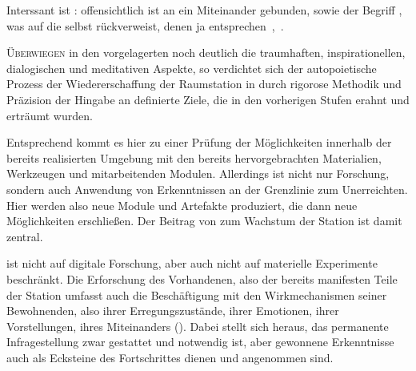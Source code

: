 Interssant ist : offensichtlich ist  an ein Miteinander gebunden, sowie der Begriff , was auf die  selbst rückverweist, denen ja  entsprechen~\cite{cbasestarbasemanual},~\cite{cbasebook}.

\begin{newstuff}
    \lettrine{Ü}{berwiegen} in den vorgelagerten  noch deutlich die traumhaften, inspirationellen, dialogischen und meditativen Aspekte, so verdichtet sich der autopoietische Prozess der Wiedererschaffung der Raumstation in  durch rigorose Methodik und Präzision der Hingabe an definierte Ziele, die in den vorherigen Stufen erahnt und erträumt wurden.

    Entsprechend kommt es hier zu einer Prüfung der Möglichkeiten innerhalb der bereits realisierten Umgebung mit den bereits hervorgebrachten Materialien, Werkzeugen und mitarbeitenden Modulen. Allerdings ist  nicht nur Forschung, sondern auch Anwendung von Erkenntnissen an der Grenzlinie zum Unerreichten. Hier werden also neue Module und Artefakte produziert, die dann neue Möglichkeiten erschließen. Der Beitrag von  zum Wachstum der Station ist damit zentral.


     ist nicht auf digitale Forschung, aber auch nicht auf materielle Experimente beschränkt. Die Erforschung des Vorhandenen, also der bereits manifesten Teile der Station umfasst auch die Beschäftigung mit den Wirkmechanismen seiner Bewohnenden, also ihrer Erregungszustände, ihrer Emotionen, ihrer Vorstellungen, ihres Miteinanders (). Dabei stellt sich heraus, das permanente Infragestellung zwar gestattet und notwendig ist, aber gewonnene Erkenntnisse auch als Ecksteine des Fortschrittes dienen und angenommen sind.


\end{newstuff}
